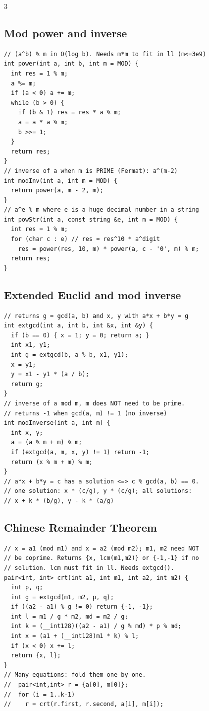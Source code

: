 \documentclass[8pt, a4paper]{article}
\begin{document}
\begin{multicols*}{3}
\subsection{Mod power and inverse}
\begin{lstlisting}
// (a^b) % m in O(log b). Needs m*m to fit in ll (m<=3e9)
int power(int a, int b, int m = MOD) {
  int res = 1 % m;
  a %= m;
  if (a < 0) a += m;
  while (b > 0) {
    if (b & 1) res = res * a % m;
    a = a * a % m;
    b >>= 1;
  }
  return res;
}
// inverse of a when m is PRIME (Fermat): a^(m-2)
int modInv(int a, int m = MOD) {
  return power(a, m - 2, m);
}
// a^e % m where e is a huge decimal number in a string
int powStr(int a, const string &e, int m = MOD) {
  int res = 1 % m;
  for (char c : e) // res = res^10 * a^digit
    res = power(res, 10, m) * power(a, c - '0', m) % m;
  return res;
}
\end{lstlisting}
\subsection{Extended Euclid and mod inverse}
\begin{lstlisting}
// returns g = gcd(a, b) and x, y with a*x + b*y = g
int extgcd(int a, int b, int &x, int &y) {
  if (b == 0) { x = 1; y = 0; return a; }
  int x1, y1;
  int g = extgcd(b, a % b, x1, y1);
  x = y1;
  y = x1 - y1 * (a / b);
  return g;
}
// inverse of a mod m, m does NOT need to be prime.
// returns -1 when gcd(a, m) != 1 (no inverse)
int modInverse(int a, int m) {
  int x, y;
  a = (a % m + m) % m;
  if (extgcd(a, m, x, y) != 1) return -1;
  return (x % m + m) % m;
}
// a*x + b*y = c has a solution <=> c % gcd(a, b) == 0.
// one solution: x * (c/g), y * (c/g); all solutions:
// x + k * (b/g), y - k * (a/g)
\end{lstlisting}
\subsection{Chinese Remainder Theorem}
\begin{lstlisting}
// x = a1 (mod m1) and x = a2 (mod m2); m1, m2 need NOT
// be coprime. Returns {x, lcm(m1,m2)} or {-1,-1} if no
// solution. lcm must fit in ll. Needs extgcd().
pair<int, int> crt(int a1, int m1, int a2, int m2) {
  int p, q;
  int g = extgcd(m1, m2, p, q);
  if ((a2 - a1) % g != 0) return {-1, -1};
  int l = m1 / g * m2, md = m2 / g;
  int k = (__int128)((a2 - a1) / g % md) * p % md;
  int x = (a1 + (__int128)m1 * k) % l;
  if (x < 0) x += l;
  return {x, l};
}
// Many equations: fold them one by one.
//  pair<int,int> r = {a[0], m[0]};
//  for (i = 1..k-1)
//    r = crt(r.first, r.second, a[i], m[i]);
\end{lstlisting}

\end{multicols*}
\end{document}
